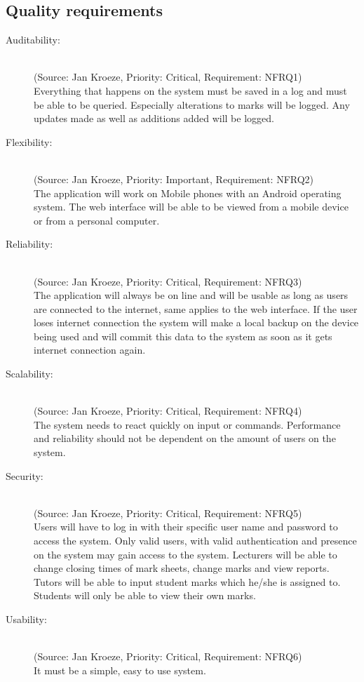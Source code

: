 \documentclass[12pt]{article}
\begin{document}
  \subsection{Quality requirements}
\begin{description}
  \item[Auditability:] \hfill  \\
  (Source: Jan Kroeze, Priority: Critical, Requirement: NFRQ1) \\
  Everything that happens on the system must be saved in a log and must be able to be queried. Especially alterations to marks will be logged. Any updates made as well as additions added will be logged. \\
  \item[Flexibility:] \hfill \\
  (Source: Jan Kroeze, Priority: Important, Requirement: NFRQ2) \\
  The application will work on Mobile phones with an Android operating system. The web interface will be able to be viewed from a mobile device or from a personal computer.\\
  \item[Reliability:] \hfill \\
  (Source: Jan Kroeze, Priority: Critical, Requirement: NFRQ3) \\
  The application will always be on line and will be usable as long as users are connected to the internet, same applies to the web interface. If the user loses internet connection the system will make a local backup on the device being used and will commit this data to the system as soon as it gets internet connection again.\\
  \item[Scalability:] \hfill \\
  (Source: Jan Kroeze, Priority: Critical, Requirement: NFRQ4) \\
  The system needs to react quickly on input or commands. Performance and reliability should not be dependent on the amount of users on the system.\\
  \item[Security:] \hfill \\
  (Source: Jan Kroeze, Priority: Critical, Requirement: NFRQ5) \\
  Users will have to log in with their specific user name and password to access the system. Only valid users, with valid authentication and presence on the system may gain access to the system. Lecturers will be able to change closing times of mark sheets, change marks and view reports. Tutors will be able to input student marks which he/she is assigned to. Students will only be able to view their own marks.  \\
  \item[Usability:] \hfill \\
  (Source: Jan Kroeze, Priority: Critical, Requirement: NFRQ6) \\
  It must be a simple, easy to use system.
\end{description} 
\end{document}
